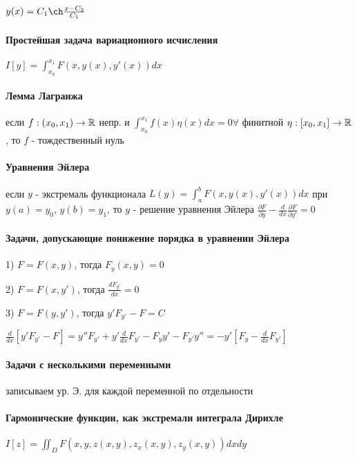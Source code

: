 \documentclass[russian,twocolumn]{article}
\begin{document}
$y(x) = C_1 \ch \frac{x-C_2}{C_1}$

\paragraph{Простейшая задача вариационного исчисления}

$I[y]=\int_{x_0}^{x_1}F(x,y(x),y'(x))dx$

\paragraph{Лемма Лагранжа}

если $f:(x_0,x_1) \to \Bbb R$ непр. и $\int_{x_0}^{x_1}f(x)\eta(x)dx=0 \forall$ финитной $\eta : [x_0, x_1] \to \Bbb R$, то $f$ - тождественный нуль

\paragraph{Уравнения Эйлера}

	если $y$ - экстремаль функционала $L(y)=\int_a^b F(x,y(x),y'(x))dx$ при $y(a)=y_0$, $y(b)=y_1$, то $y$ - решение уравнения Эйлера $\frac{\partial F}{\partial y} - \frac{d}{dx}\frac{\partial F}{\partial y'} = 0$

\paragraph{Задачи, допускающие понижение порядка в уравнении Эйлера}

1) $F=F(x,y)$, тогда $F_y(x,y) = 0$

2) $F=F(x,y')$, тогда $\frac{dF_{y'}}{dx} = 0$

3) $F=F(y,y')$, тогда $y'F_{y'}-F=C$

$\frac{d}{dx}[y'F_{y'}-F]=y''F_{y'}+y'\frac{d}{dx}F_{y'}-F_{y}y'-F_{y'}y''=-y'[F_y-\frac{d}{dx}F_{y'}]$

\paragraph{Задачи с несколькими переменными}

записываем ур. Э. для каждой переменной по отдельности

\paragraph{Гармонические функции, как экстремали интеграла Дирихле}

$I[z]=\iint_D F(x,y,z(x,y),z_x(x,y),z_y(x,y)) dx dy$
\end{document}
